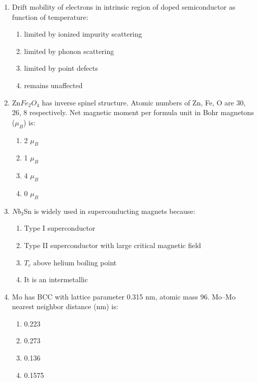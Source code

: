 \documentclass[journal,cmex10]{IEEEtran}
\theoremstyle{remark}
\numberwithin{equation}{enumi}
\numberwithin{figure}{enumi}
\begin{document}
\begin{enumerate}[label=\arabic*)]
\vspace{0.5cm}
\item Drift mobility of electrons in intrinsic region of doped semiconductor as function of temperature:  
\hfill{}
\begin{enumerate}[label=\alph*)]
    \item limited by ionized impurity scattering
    \item limited by phonon scattering
    \item limited by point defects
    \item remains unaffected
\end{enumerate}

\vspace{0.5cm}
\item  Zn$Fe_2$$O_4$ has inverse spinel structure. Atomic numbers of Zn, Fe, O are 30, 26, 8 respectively. Net magnetic moment per formula unit in Bohr magnetons ($\mu_B$) is:
\vspace{0.1cm}
\hfill{}
\begin{enumerate}[label=\alph*)]
    \item 2 $\mu_B$
    \item 1 $\mu_B$
    \item 4 $\mu_B$
    \item 0 $\mu_B$
\end{enumerate}

\newpage
\item $Nb_3$Sn is widely used in superconducting magnets because:
\vspace{0.3cm}
\hfill{}
\begin{enumerate}[label=\alph*)]
    \item Type I superconductor
    \item Type II superconductor with large critical magnetic field
    \item $T_c$ above helium boiling point
    \item It is an intermetallic
\end{enumerate}

\vspace{0.5cm}
\item  Mo has BCC with lattice parameter 0.315 nm, atomic mass 96. Mo–Mo nearest neighbor distance (nm) is: 
\hfill{}
\begin{enumerate}[label=\alph*)]
    \item 0.223
    \item 0.273
    \item 0.136
    \item 0.1575
\end{enumerate}


\end{enumerate}
\end{document}
